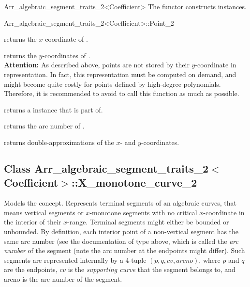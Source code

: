 \begin{ccRefClass}{Arr_algebraic_segment_traits_2<Coefficient>}
The functor  constructs  instances.

\begin{ccClass}{Arr_algebraic_segment_traits_2<Coefficient>::Point_2}


  {returns the $x$-coordinate of \ccVar.}

  {returns the $y$-coordinates of \ccVar. \\
   \textbf{Attention:} As described above, points are not stored
   by their $y$-coordinate in  representation. In fact,
   this representation must be computed on demand, and might become quite
   costly for points defined by high-degree polynomials. Therefore, it is
   recommended to avoid to call this function as much as possible.}

  {returns a  instance that \ccVar is part of.}

  {returns the arc number of \ccVar.}

  {returns double-approximations of the $x$- and $y$-coordinates.}

\end{ccClass}


\subsection*{Class 
Arr\_algebraic\_segment\_traits\_2$<$Coefficient$>$::X\_monotone\_curve\_2}

Models the  concept.
Represents terminal segments of an algebraic curves,
that means vertical segments or $x$-monotone segments with no critical
$x$-coordinate in the interior of their $x$-range.
Terminal segments might either be bounded or unbounded.
By definition, each interior point of 
a non-vertical segment has the same arc number (see the documentation of 
type  above, which is called the \emph{arc number} of the segment
(note the arc number at the endpoints might differ).
Such segments are represented internally by a 4-tuple $(p,q,cv,arcno)$,
where $p$ and $q$ are the endpoints, $cv$ is the \emph{supporting curve}
that the segment belongs to, and arcno is the arc number of the segment.


\end{ccRefClass}
